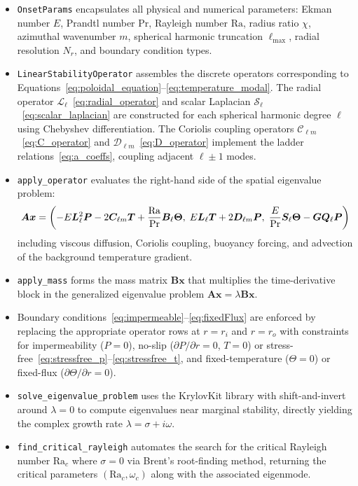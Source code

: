 \documentclass[11pt]{article}
\numberwithin{equation}{section}
\begin{document}
\begin{itemize}
  \item \texttt{OnsetParams} encapsulates all physical and numerical parameters: Ekman number $E$, Prandtl number $\mathrm{Pr}$, Rayleigh number $\mathrm{Ra}$, radius ratio $\chi$, azimuthal wavenumber $m$, spherical harmonic truncation $\ell_{\max}$, radial resolution $N_r$, and boundary condition types.

  \item \texttt{LinearStabilityOperator} assembles the discrete operators corresponding to Equations~\eqref{eq:poloidal_equation}--\eqref{eq:temperature_modal}. The radial operator $\mathcal{L}_\ell$~\eqref{eq:radial_operator} and scalar Laplacian $\mathcal{S}_\ell$~\eqref{eq:scalar_laplacian} are constructed for each spherical harmonic degree $\ell$ using Chebyshev differentiation. The Coriolis coupling operators $\mathcal{C}_{\ell m}$~\eqref{eq:C_operator} and $\mathcal{D}_{\ell m}$~\eqref{eq:D_operator} implement the ladder relations~\eqref{eq:a_coeffs}, coupling adjacent $\ell \pm 1$ modes.

  \item \texttt{apply\_operator} evaluates the right-hand side of the spatial eigenvalue problem:
  \[
    \bm{A}\bm{x} = \qty(-E\bm{L}_\ell^2 \bm{P} - 2\bm{C}_{\ell m}\bm{T} + \frac{\mathrm{Ra}}{\mathrm{Pr}}\bm{B}_\ell\bm{\Theta},\;
    E\bm{L}_\ell\bm{T} + 2\bm{D}_{\ell m}\bm{P},\;
    \frac{E}{\mathrm{Pr}}\bm{S}_\ell\bm{\Theta} - \bm{G}\bm{Q}_\ell\bm{P} )
  \]
  including viscous diffusion, Coriolis coupling, buoyancy forcing, and advection of the background temperature gradient.

  \item \texttt{apply\_mass} forms the mass matrix $\bm{B}\bm{x}$ that multiplies the time-derivative block in the generalized eigenvalue problem $\bm{A}\bm{x} = \lambda\bm{B}\bm{x}$.

  \item Boundary conditions~\eqref{eq:impermeable}--\eqref{eq:fixedFlux} are enforced by replacing the appropriate operator rows at $r=r_i$ and $r=r_o$ with constraints for impermeability ($P=0$), no-slip ($\partial P/\partial r=0$, $T=0$) or stress-free~\eqref{eq:stressfree_p}--\eqref{eq:stressfree_t}, and fixed-temperature ($\Theta=0$) or fixed-flux ($\partial\Theta/\partial r=0$).

  \item \texttt{solve\_eigenvalue\_problem} uses the KrylovKit library with shift-and-invert around $\lambda=0$ to compute eigenvalues near marginal stability, directly yielding the complex growth rate $\lambda = \sigma + i\omega$.

  \item \texttt{find\_critical\_rayleigh} automates the search for the critical Rayleigh number $\mathrm{Ra}_c$ where $\sigma=0$ via Brent's root-finding method, returning the critical parameters $(\mathrm{Ra}_c, \omega_c)$ along with the associated eigenmode.
\end{itemize}
\end{document}
